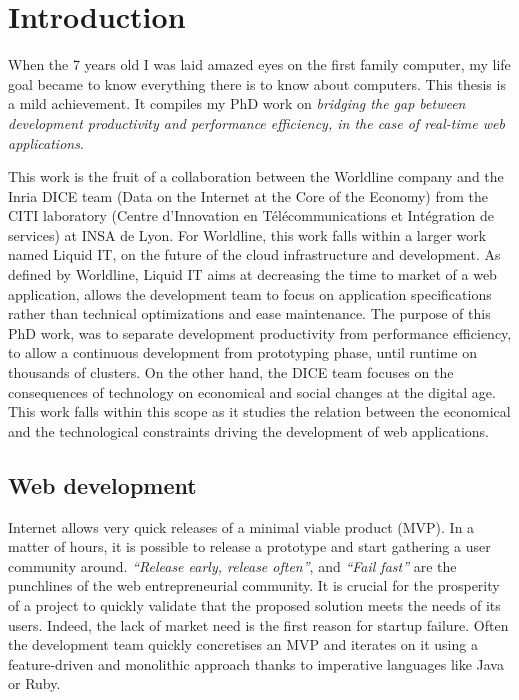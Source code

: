 \chapter{Introduction} \label{chapter:conclusion}
\minitoc
\eject

When the 7 years old I was laid amazed eyes on the first family computer, my life goal became to know everything there is to know about computers.
This thesis is a mild achievement.
It compiles my PhD work on
\textit{bridging the gap between development productivity and performance efficiency, in the case of real-time web applications}.


This work is the fruit of a collaboration between the Worldline company and the Inria DICE team (Data on the Internet at the Core of the Economy) from the CITI laboratory (Centre d’Innovation en Télécommunications et Intégration
de services) at INSA de Lyon.
For Worldline, this work falls within a larger work named Liquid IT, on the future of the cloud infrastructure and development.
As defined by Worldline, Liquid IT aims at decreasing the time to market of a web application, allows the development team to focus on application specifications rather than technical optimizations and ease maintenance.
The purpose of this PhD work, was to separate development productivity from performance efficiency, to allow a continuous development from prototyping phase, until runtime on thousands of clusters.
On the other hand, the DICE team focuses on the consequences of technology on economical and social changes at the digital age.
This work falls within this scope as it studies the relation between the economical and the technological constraints driving the development of web applications.

\section{Web development}

Internet allows very quick releases of a minimal viable product (MVP).
In a matter of hours, it is possible to release a prototype and start gathering a user community around.
\textit{``Release early, release often''}, and \textit{``Fail fast''} are the punchlines of the web entrepreneurial community.
It is crucial for the prosperity of a project to quickly validate that the proposed solution meets the needs of its users.
Indeed, the lack of market need is the first reason for startup failure.
Often the development team quickly concretises an MVP and iterates on it using a feature-driven and monolithic approach thanks to imperative languages like Java or Ruby.

